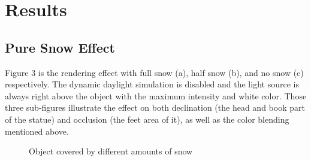 \documentclass{article}
\begin{document}
\section{Results}

\subsection {Pure Snow Effect}
Figure 3 is the rendering effect with full snow (a), half snow (b), and no snow (c) respectively. The dynamic daylight simulation is 
disabled and the light source is always right above the object with the maximum intensity and white color. Those three sub-figures 
illustrate the effect on both declination (the head and book part of the statue) and occlusion (the feet area of it), as well as the 
color blending mentioned above.

\begin{figure}[h]
  \centering
  \caption{Object covered by different amounts of snow}
  \label{fig:PureSnow}
\end{figure}
\end{document}
